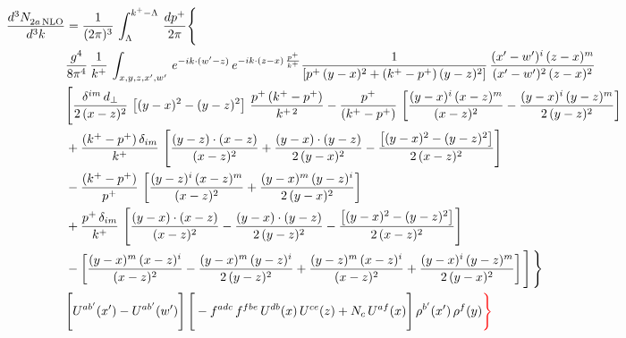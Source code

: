 \documentclass[9pt]{article}
\numberwithin{equation}{section}
\begin{document}
\begin{align}
    \frac{d^{3}N_{2a\,\rm NLO}^{\rm}}{d^{3}k}  & =  \frac{1}{(2\pi)^{3}}\,\int_{\Lambda}^{k^{+}-\Lambda}\, \frac{dp^{+}}{2\pi}\Bigg\{\notag \\ & \frac{g^{4}}{8\pi^{4}}\,\frac{1}{k^{+}}\, \int_{x,y,z,x',w'}\,e^{-ik\cdot(w'-z)}\,e^{-ik\cdot (z-x)\,\frac{p^{+}}{k^{+}}}\frac{1}{\left[p^{+}\,(y-x)^{2}+(k^{+}-p^{+})\,(y-z)^{2}\right]}\, \frac{(x'-w')^{i}\,(z-x)^{m}}{(x'-w')^{2}\,(z-x)^{2}} \notag \\ & \Bigg[\frac{\delta^{im}\,d_{\perp}}{2\,(x-z)^{2}}\,\left[(y-x)^{2}-(y-z)^{2}\right]\,\frac{p^{+}\,(k^{+}-p^{+})}{k^{+\,2}}-\frac{p^{+}}{(k^{+}-p^{+})}\,\left[\frac{(y-x)^{i}\,(x-z)^{m}}{(x-z)^{2}}-\frac{(y-x)^{i}\,(y-z)^{m}}{2\,(y-z)^{2}}\right]\notag \\ & +\frac{(k^{+}-p^{+})\,\delta_{im}}{k^{+}}\,\left[\frac{(y-z)\cdot (x-z)}{(x-z)^{2}}+\frac{(y-x)\cdot (y-z)}{2\,(y-x)^{2}}-\frac{\left[(y-x)^{2}-(y-z)^{2}\right]}{2\,(x-z)^{2}}\right]\notag \\ & -\frac{(k^{+}-p^{+})}{p^{+}}\,\left[\frac{(y-z)^{i}\,(x-z)^{m}}{(x-z)^{2}}+\frac{(y-x)^{m}\,(y-z)^{i}}{2\,(y-x)^{2}}\right]\notag \\ & +\frac{p^{+}\,\delta_{im}}{k^{+}}\,\left[\frac{(y-x)\cdot (x-z)}{(x-z)^{2}}-\frac{(y-x)\cdot (y-z)}{2\,(y-z)^{2}}-\frac{\left[(y-x)^{2}-(y-z)^{2}\right]}{2\,(x-z)^{2}}\right]\notag \\ &-\left[\frac{(y-x)^{m}\,(x-z)^{i}}{(x-z)^{2}}-\frac{(y-x)^{m}\,(y-z)^{i}}{2\,(y-z)^{2}}+\frac{(y-z)^{m}\,(x-z)^{i}}{(x-z)^{2}}+\frac{(y-x)^{i}\,(y-z)^{m}}{2\,(y-x)^{2}}\right]\Bigg]\,\Bigg\} \notag \\ & \Bigg[U^{ab'}(x')-U^{ab'}(w')\Bigg]\,\Bigg[-f^{adc}\,f^{fbe}\,U^{db}(x)\,U^{ce}(z)+N_{c}\,U^{af}(x)\Bigg]\,\rho^{b'}(x')\,\rho^{f}(y){\color{red}\Bigg\}}
\end{align}
\end{document}
